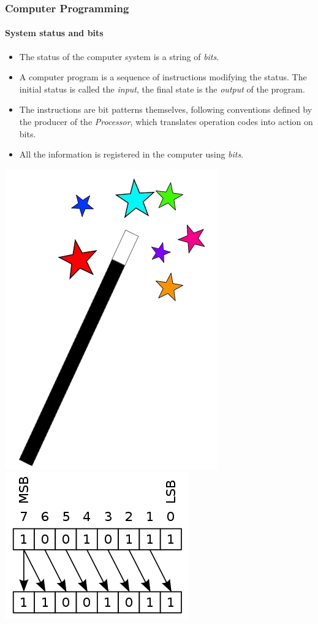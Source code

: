 \documentclass[unknownkeysallowed, 10pt, a4 paper, handout]{beamer}
\begin{document}
\begin{frame}[label=Program]
  \frametitle{Computer Programming}
  \framesubtitle{System status and bits}
  \begin{itemize}
   \item The status of the computer system is a string of \emph{bits}.
   \item A computer program is a sequence of instructions modifying 
       the status. The initial status is called the \emph{input}, the
          final state is the \emph{output} of the program.
   \item The instructions are bit patterns themselves, following
       conventions defined by the producer of the \emph{Processor},
       which translates operation codes into action on bits.
   \item All the information is registered in the computer using \emph{bits}.
  \end{itemize}
  \begin{center}
    \includegraphics[scale=0.15]{pics/wand.png}
    \includegraphics[scale=0.35]{pics/bits.png}
  \end{center}
\end{frame}
\end{document}
